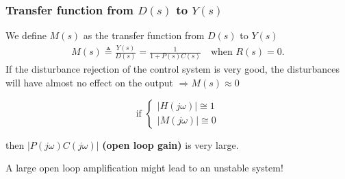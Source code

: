 \begin{frame}
	\frametitle{Transfer function from $D(s)$ to $Y(s)$}
	\begin{definition}
		We define $M(s)$ as the transfer function from $D(s)$ to $Y(s)$
		\begin{align*}
		M(s) \triangleq \frac{Y(s)}{D(s)} = \frac{1}{1 + P(s)C(s)} \quad \text{when } R(s) = 0.
		\end{align*}
		If the disturbance rejection of the control system is very good, the disturbances will have almost no effect on the output $\Rightarrow M(s) \approx 0$ \\
	\end{definition}
	\begin{block}{}
		\vspace*{-1em}
		\begin{minipage}{0.2\linewidth}
		\[\text{if }
		\begin{cases}
			\left| H(j\omega) \right| \cong 1 \\
			\left| M(j\omega) \right| \cong 0
		\end{cases}
		\]
	\end{minipage}
	\hfill
	\begin{minipage}{0.7\linewidth}
		\vspace*{1em}
		then $ \left| P(j\omega)C(j\omega) \right|$ \textbf{(open loop gain)} is very large.
	\end{minipage}
	\end{block}
	\begin{alertblock}{}
		A large open loop amplification might lead to an unstable system!
	\end{alertblock}
\end{frame}

